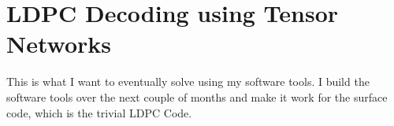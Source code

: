 \chapter*{LDPC Decoding using Tensor Networks}

This is what I want to eventually solve using my software tools. I build the software tools over the next couple of months and make it work for the surface code, which is the trivial LDPC Code. 